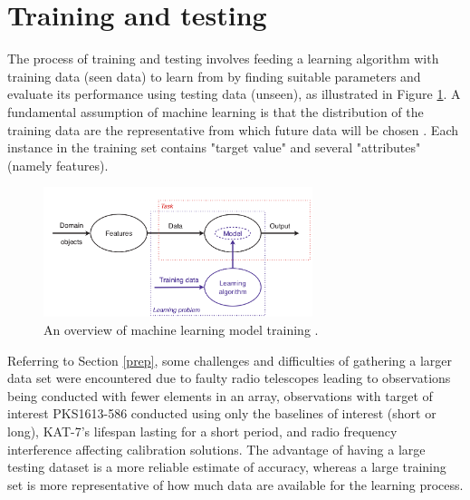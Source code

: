 \section{Training and testing}
\label{TT}
The process of training and testing involves feeding a learning algorithm with training data (seen data) to learn from by finding suitable parameters and evaluate its performance using testing data (unseen), as illustrated in Figure \ref{overview}. A fundamental assumption of machine learning is that the distribution of the training data are the representative from which future data will be chosen \citep{witten2016data}. Each instance in the training set contains "target value" and several "attributes" (namely features). 

\begin{figure}[H]
  \centering
    \includegraphics[width=0.7\textwidth]{images/MLSampler.png}
    \caption{An overview of machine learning model training \citep{flach2012machine}.}
  \label{overview}
\end{figure}

Referring to Section \ref{prep}, some challenges and difficulties of gathering  a larger data set were encountered  due to faulty radio telescopes leading to observations being conducted with fewer elements in an array, observations with target of interest PKS1613-586 conducted using only the baselines of interest (short or long), KAT-7's lifespan lasting for a short period, and radio frequency interference affecting calibration solutions. The advantage of having a large testing dataset is a more reliable estimate of accuracy, whereas a large training set is more representative of how much data are available for the learning process. 

